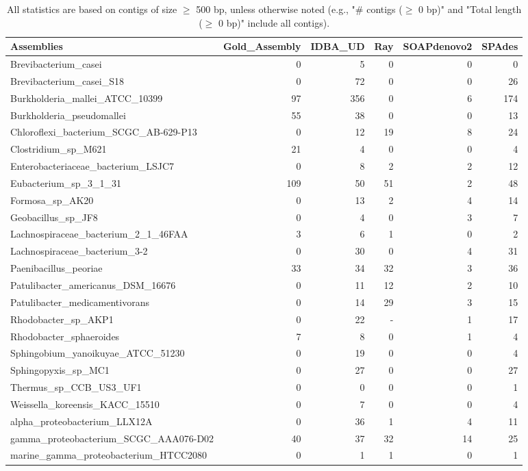 \documentclass[12pt,a4paper]{article}
\begin{document}
\begin{table}[ht]
\begin{center}
\caption{All statistics are based on contigs of size $\geq$ 500 bp, unless otherwise noted (e.g., "\# contigs ($\geq$ 0 bp)" and "Total length ($\geq$ 0 bp)" include all contigs).}
\begin{tabular}{|l*{5}{|r}|}
\hline
Assemblies & Gold\_Assembly & IDBA\_UD & Ray & SOAPdenovo2 & SPAdes \\ \hline
Brevibacterium\_casei & 0 & 5 & 0 & 0 & 0 \\ \hline
Brevibacterium\_casei\_S18 & 0 & 72 & 0 & 0 & 26 \\ \hline
Burkholderia\_mallei\_ATCC\_10399 & 97 & 356 & 0 & 6 & 174 \\ \hline
Burkholderia\_pseudomallei & 55 & 38 & 0 & 0 & 13 \\ \hline
Chloroflexi\_bacterium\_SCGC\_AB-629-P13 & 0 & 12 & 19 & 8 & 24 \\ \hline
Clostridium\_sp\_M621 & 21 & 4 & 0 & 0 & 4 \\ \hline
Enterobacteriaceae\_bacterium\_LSJC7 & 0 & 8 & 2 & 2 & 12 \\ \hline
Eubacterium\_sp\_3\_1\_31 & 109 & 50 & 51 & 2 & 48 \\ \hline
Formosa\_sp\_AK20 & 0 & 13 & 2 & 4 & 14 \\ \hline
Geobacillus\_sp\_JF8 & 0 & 4 & 0 & 3 & 7 \\ \hline
Lachnospiraceae\_bacterium\_2\_1\_46FAA & 3 & 6 & 1 & 0 & 2 \\ \hline
Lachnospiraceae\_bacterium\_3-2 & 0 & 30 & 0 & 4 & 31 \\ \hline
Paenibacillus\_peoriae & 33 & 34 & 32 & 3 & 36 \\ \hline
Patulibacter\_americanus\_DSM\_16676 & 0 & 11 & 12 & 2 & 10 \\ \hline
Patulibacter\_medicamentivorans & 0 & 14 & 29 & 3 & 15 \\ \hline
Rhodobacter\_sp\_AKP1 & 0 & 22 & - & 1 & 17 \\ \hline
Rhodobacter\_sphaeroides & 7 & 8 & 0 & 1 & 4 \\ \hline
Sphingobium\_yanoikuyae\_ATCC\_51230 & 0 & 19 & 0 & 0 & 4 \\ \hline
Sphingopyxis\_sp\_MC1 & 0 & 27 & 0 & 0 & 27 \\ \hline
Thermus\_sp\_CCB\_US3\_UF1 & 0 & 0 & 0 & 0 & 1 \\ \hline
Weissella\_koreensis\_KACC\_15510 & 0 & 7 & 0 & 0 & 4 \\ \hline
alpha\_proteobacterium\_LLX12A & 0 & 36 & 1 & 4 & 11 \\ \hline
gamma\_proteobacterium\_SCGC\_AAA076-D02 & 40 & 37 & 32 & 14 & 25 \\ \hline
marine\_gamma\_proteobacterium\_HTCC2080 & 0 & 1 & 1 & 0 & 1 \\ \hline
\end{tabular}
\end{center}
\end{table}
\end{document}
